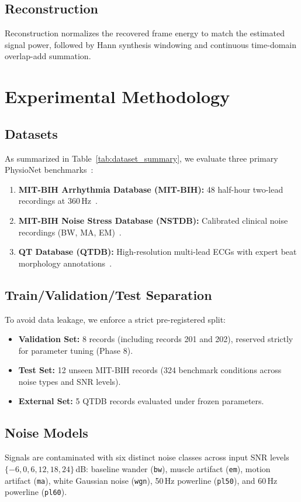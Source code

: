 \documentclass[journal,compsoc]{IEEEtran}
\begin{document}
\subsection{Reconstruction}
Reconstruction normalizes the recovered frame energy to match the estimated signal power, followed by Hann synthesis windowing and continuous time-domain overlap-add summation.

\section{Experimental Methodology}
\subsection{Datasets}

As summarized in Table~\ref{tab:dataset_summary}, we evaluate three primary PhysioNet benchmarks~\cite{goldberger2000physiobank}:
\begin{enumerate}
    \item \textbf{MIT-BIH Arrhythmia Database (MIT-BIH):} 48 half-hour two-lead recordings at 360\,Hz~\cite{moody2001mitbih}.
    \item \textbf{MIT-BIH Noise Stress Database (NSTDB):} Calibrated clinical noise recordings (BW, MA, EM)~\cite{moody1984nstdb}.
    \item \textbf{QT Database (QTDB):} High-resolution multi-lead ECGs with expert beat morphology annotations~\cite{laguna1997qtdb}.
\end{enumerate}

\subsection{Train/Validation/Test Separation}
To avoid data leakage, we enforce a strict pre-registered split:
\begin{itemize}
    \item \textbf{Validation Set:} 8 records (including records 201 and 202), reserved strictly for parameter tuning (Phase 8).
    \item \textbf{Test Set:} 12 unseen MIT-BIH records (324 benchmark conditions across noise types and SNR levels).
    \item \textbf{External Set:} 5 QTDB records evaluated under frozen parameters.
\end{itemize}

\subsection{Noise Models}
Signals are contaminated with six distinct noise classes across input SNR levels $\{-6, 0, 6, 12, 18, 24\}$\,dB: baseline wander (\texttt{bw}), muscle artifact (\texttt{em}), motion artifact (\texttt{ma}), white Gaussian noise (\texttt{wgn}), 50\,Hz powerline (\texttt{pl50}), and 60\,Hz powerline (\texttt{pl60}).
\end{document}
